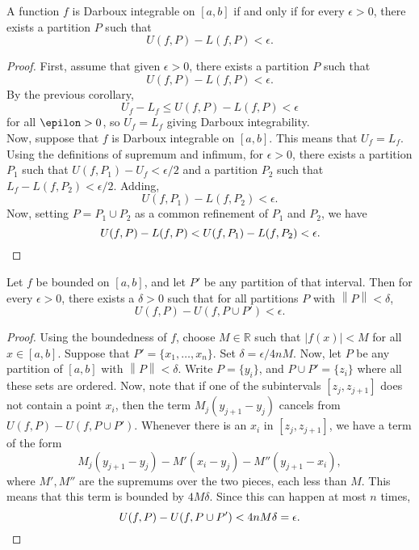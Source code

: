 \documentclass[11pt]{article}
\def\R{\mathbb{R}}
\newcommand\norm[1]{\left\lVert#1\right\rVert}
\theoremstyle{definition}
\theoremstyle{remark}
\numberwithin{equation}{module}
\begin{document}
    \begin{theorem}
        A function $f$ is Darboux integrable on $[a, b]$ if and only if for every
        $\epsilon > 0$, there exists a partition $P$ such that \[
            U(f, P) - L(f, P) < \epsilon.
        \] 
    \end{theorem}
    \begin{proof}
        First, assume that given $\epsilon > 0$, there exists a partition $P$ such
        that \[
            U(f, P) - L(f, P) < \epsilon.
        \] By the previous corollary, \[
            U_f - L_f \leq U(f, P) - L(f, P) < \epsilon
        \] for all $\epilon > 0$, so $U_f = L_f$ giving Darboux integrability. \\

        \noindent
        Now, suppose that $f$ is Darboux integrable on $[a, b]$. This means that
        $U_f = L_f$. Using the definitions of supremum and infimum, for $\epsilon >
        0$, there exists a partition $P_1$ such that $U(f, P_1) - U_f < \epsilon /
        2$ and a partition $P_2$ such that $L_f - L(f, P_2) < \epsilon / 2$. Adding,
        \[
            U(f, P_1) - L(f, P_2) < \epsilon.
        \] Now, setting $P = P_1 \cup P_2$ as a common refinement of $P_1$ and
        $P_2$, we have \[
            U(f, P) - L(f, P) < U(f, P_1) - L(f, P_2) < \epsilon. \qedhere
        \] 
    \end{proof}

    \begin{lemma}
        Let $f$ be bounded on $[a, b]$, and let $P'$ be any partition of that
        interval. Then for every $\epsilon > 0$, there exists a $\delta > 0$ such that
        for all partitions $P$ with $\norm{P} < \delta$, \[
            U(f, P) - U(f, P \cup P') < \epsilon.
        \] 
    \end{lemma}
    \begin{proof}
        Using the boundedness of $f$, choose $M \in \R$ such that $|f(x)| < M$ for
        all $x \in [a, b]$. Suppose that $P' = \{x_1, \dots, x_n\}$. Set $\delta =
        \epsilon / 4nM$. Now, let $P$ be any partition of $[a, b]$ with $\norm{P} <
        \delta$. Write $P = \{y_i\}$, and $P\cup P' = \{z_i\}$ where all these sets
        are ordered. Now, note that if one of the subintervals $[z_j, z_{j + 1}]$
        does not contain a point $x_i$, then the term $M_j(y_{j + 1} - y_{j})$
        cancels from $U(f, P) - U(f, P\cup P')$. Whenever there is an $x_i$ in
        $[z_j, z_{j + 1}]$, we have a term of the form \[
            M_j(y_{j + 1} - y_j) - M'(x_i - y_j) - M''(y_{j + 1} - x_i),
        \] where $M', M''$ are the supremums over the two pieces, each less than
        $M$. This means that this term is bounded by $4M\delta$. Since this can
        happen at most $n$ times, \[
            U(f, P) - U(f, P \cup P') < 4nM\delta = \epsilon. \qedhere
        \] 
    \end{proof}
\end{document}
